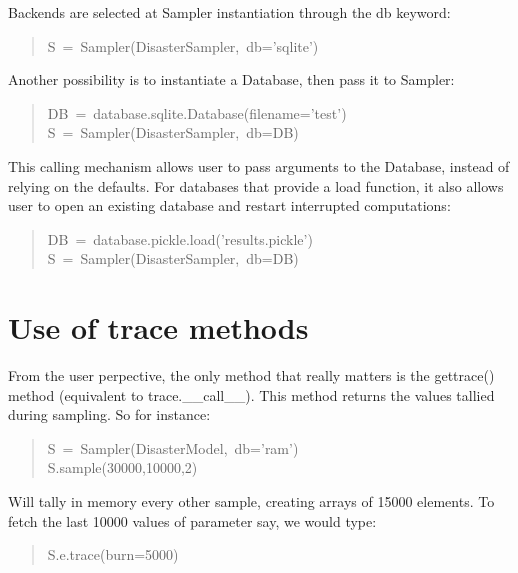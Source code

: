 Backends are selected at Sampler instantiation through the db keyword:
\begin{quote}{\ttfamily \raggedright \noindent
S~=~Sampler(DisasterSampler,~db='sqlite')
}\end{quote}

Another possibility is to instantiate a Database, then pass it to Sampler:
\begin{quote}{\ttfamily \raggedright \noindent
DB~=~database.sqlite.Database(filename='test')~\\
S~=~Sampler(DisasterSampler,~db=DB)
}\end{quote}

This calling mechanism allows user to pass arguments to the Database, instead
of relying on the defaults. For databases that provide a load function, it also
allows user to open an existing database and restart interrupted computations:
\begin{quote}{\ttfamily \raggedright \noindent
DB~=~database.pickle.load('results.pickle')~\\
S~=~Sampler(DisasterSampler,~db=DB)
}\end{quote}



\hypertarget{use-of-trace-methods}{}
\section*{Use of trace methods}
\label{use-of-trace-methods}

From the user perpective, the only method that really matters is the gettrace()
method (equivalent to trace.{\_}{\_}call{\_}{\_}). This method returns the values tallied during sampling. So for
instance:
\begin{quote}{\ttfamily \raggedright \noindent
S~=~Sampler(DisasterModel,~db='ram')~\\
S.sample(30000,10000,2)
}\end{quote}

Will tally in memory every other sample, creating arrays of 15000 elements. To
fetch the last 10000 values of parameter  say, we would type:
\begin{quote}{\ttfamily \raggedright \noindent
S.e.trace(burn=5000)
}\end{quote}



